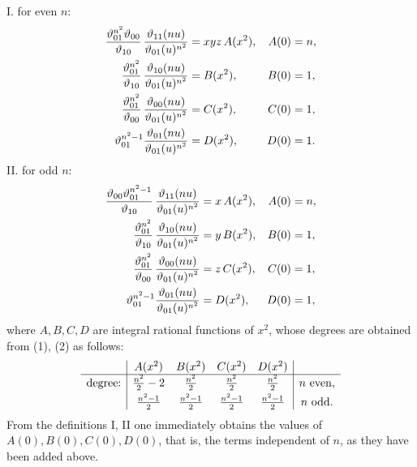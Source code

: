 \documentclass[11pt]{article}
\begin{document}
I. for even $n$:
\begin{equation*}
\begin{aligned}
{\vartheta_{01}^{n^2}\vartheta_{00}\over\vartheta_{10}}\,
{\vartheta_{11}(nu)\over \vartheta_{01}(u)^{n^2}}&=xyz\,A(x^2),
& A(0)&=n,\\
{\vartheta_{01}^{n^2}\over\vartheta_{10}}\,
{\vartheta_{10}(nu)\over \vartheta_{01}(u)^{n^2}}&=B(x^2),
& B(0)&=1,\\
{\vartheta_{01}^{n^2}\over\vartheta_{00}}\,
{\vartheta_{00}(nu)\over \vartheta_{01}(u)^{n^2}}&=C(x^2),
& C(0)&=1,\\
\vartheta_{01}^{n^2-1}{\vartheta_{01}(nu)\over \vartheta_{01}(u)^{n^2}}&=D(x^2),
& D(0)&=1.
\end{aligned}
\end{equation*}
II. for odd $n$:
\begin{equation*}
\begin{aligned}
{\vartheta_{00}\vartheta_{01}^{n^2-1}\over\vartheta_{10}}\,
{\vartheta_{11}(nu)\over \vartheta_{01}(u)^{n^2}}&=x\,A(x^2),
& A(0)&=n,\\
{\vartheta_{01}^{n^2}\over\vartheta_{10}}\,
{\vartheta_{10}(nu)\over \vartheta_{01}(u)^{n^2}}&=y\,B(x^2),
& B(0)&=1,\\
{\vartheta_{01}^{n^2}\over\vartheta_{00}}\,
{\vartheta_{00}(nu)\over \vartheta_{01}(u)^{n^2}}&=z\,C(x^2),
& C(0)&=1,\\
\vartheta_{01}^{n^2-1}{\vartheta_{01}(nu)\over \vartheta_{01}(u)^{n^2}}&=D(x^2),
& D(0)&=1,
\end{aligned}
\end{equation*}
where $A,B,C,D$ are integral rational functions of $x^2$, whose degrees are obtained
from (1), (2) as follows:
\[
\begin{array}{c|cccc|c}
 & A(x^2)&B(x^2)&C(x^2)&D(x^2)&\\ \hline
\text{degree:}&{n^2\over2}-2&{n^2\over2}&{n^2\over2}&{n^2\over2}&n\ \text{even},\\[0.3em]
&{n^2-1\over2}&{n^2-1\over2}&{n^2-1\over2}&{n^2-1\over2}&n\ \text{odd}.
\end{array}
\]
From the definitions I, II one immediately obtains the values of $A(0),B(0),C(0),D(0)$,
that is, the terms independent of $n$, as they have been added above.
\end{document}
